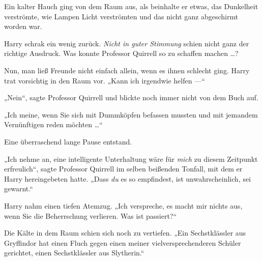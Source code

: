 Ein kalter Hauch ging von dem Raum aus, als beinhalte er etwas, das Dunkelheit verströmte, wie Lampen Licht verströmten und das nicht ganz abgeschirmt worden war.

Harry schrak ein wenig zurück. \emph{Nicht in guter Stimmung} schien nicht ganz der richtige Ausdruck. Was konnte Professor Quirrell so zu schaffen machen …?

Nun, man ließ Freunde nicht einfach allein, wenn es ihnen schlecht ging. Harry trat vorsichtig in den Raum vor.
„Kann ich irgendwie helfen —“

„Nein“, sagte Professor Quirrell und blickte noch immer nicht von dem Buch auf.

„Ich meine, wenn Sie sich mit Dummköpfen befassen mussten und mit jemandem Vernünftigen reden möchten …“

Eine überraschend lange Pause entstand.


„Ich nehme an, eine intelligente Unterhaltung wäre für \emph{mich} zu diesem Zeitpunkt erfreulich“, sagte Professor Quirrell im selben beißenden Tonfall, mit dem er Harry hereingebeten hatte.
„Dass \emph{du} es so empfindest, ist unwahrscheinlich, sei gewarnt.“

Harry nahm einen tiefen Atemzug.
„Ich verspreche, es macht mir nichts aus, wenn Sie die Beherrschung verlieren. Was ist passiert?“

Die Kälte in dem Raum schien sich noch zu vertiefen.
„Ein Sechstklässler aus Gryffindor hat einen Fluch gegen einen meiner vielversprechenderen Schüler gerichtet, einen Sechstklässler aus Slytherin.“

